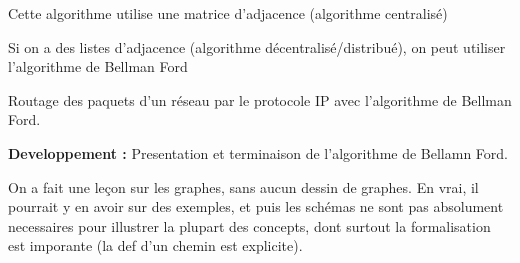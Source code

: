 \begin{rem}
	Cette algorithme utilise une matrice d'adjacence (algorithme centralisé)
\end{rem}

\begin{algo}
	Si on a des listes d'adjacence (algorithme décentralisé/distribué), on peut utiliser l'algorithme de Bellman Ford
\end{algo}

\begin{appl}
	Routage des paquets d'un réseau par le protocole IP avec l'algorithme de Bellman Ford.
\end{appl}

\noindent \textbf{Developpement :} Presentation et terminaison de l'algorithme de Bellamn Ford.


\begin{com}
	On a fait une leçon sur les graphes, sans aucun dessin de graphes. En vrai, il pourrait y en avoir sur des exemples, et puis les schémas ne sont pas absolument necessaires pour illustrer la plupart des concepts, dont surtout la formalisation est imporante (la def d'un chemin est explicite).
\end{com}


